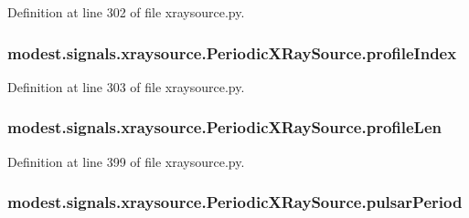 Definition at line 302 of file xraysource.\+py.

\subsubsection[{\texorpdfstring{profile\+Index}{profileIndex}}]{\setlength{\rightskip}{0pt plus 5cm}modest.\+signals.\+xraysource.\+Periodic\+X\+Ray\+Source.\+profile\+Index}\hypertarget{classmodest_1_1signals_1_1xraysource_1_1PeriodicXRaySource_aaf45141c09e1fd35c80c49907fa44497}{}\label{classmodest_1_1signals_1_1xraysource_1_1PeriodicXRaySource_aaf45141c09e1fd35c80c49907fa44497}


Definition at line 303 of file xraysource.\+py.

\subsubsection[{\texorpdfstring{profile\+Len}{profileLen}}]{\setlength{\rightskip}{0pt plus 5cm}modest.\+signals.\+xraysource.\+Periodic\+X\+Ray\+Source.\+profile\+Len}\hypertarget{classmodest_1_1signals_1_1xraysource_1_1PeriodicXRaySource_a9d4e5488915741b792df74c256782777}{}\label{classmodest_1_1signals_1_1xraysource_1_1PeriodicXRaySource_a9d4e5488915741b792df74c256782777}


Definition at line 399 of file xraysource.\+py.

\subsubsection[{\texorpdfstring{pulsar\+Period}{pulsarPeriod}}]{\setlength{\rightskip}{0pt plus 5cm}modest.\+signals.\+xraysource.\+Periodic\+X\+Ray\+Source.\+pulsar\+Period}\hypertarget{classmodest_1_1signals_1_1xraysource_1_1PeriodicXRaySource_aeb6d4a8057d3ee58c81e69fb97b9eef7}{}\label{classmodest_1_1signals_1_1xraysource_1_1PeriodicXRaySource_aeb6d4a8057d3ee58c81e69fb97b9eef7}


